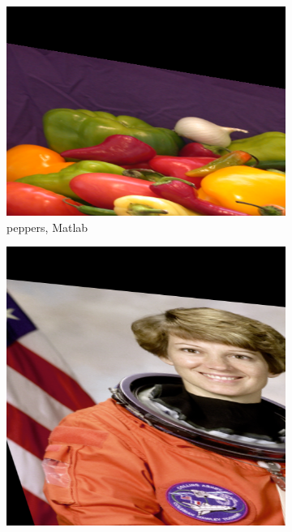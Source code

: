 \documentclass{article}
\begin{document}
\begin{figure}[!ht]
    \centering
    \begin{subfigure}{0.356\textwidth}
        \includegraphics[width=\textwidth]{./fig/affine_peppers.png}
        \caption{peppers, Matlab}
    \end{subfigure}
    \begin{subfigure}{0.267\textwidth}
        \includegraphics[width=\textwidth]{./fig/affine_astronaut.png}

\end{subfigure}
\end{figure}
\end{document}
